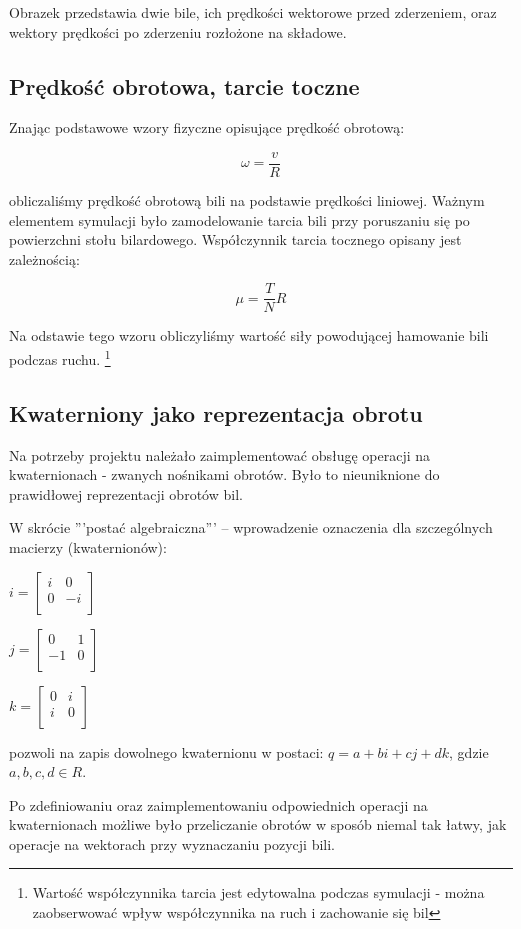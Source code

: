Obrazek przedstawia dwie bile, ich prędkości wektorowe przed zderzeniem, oraz wektory prędkości po zderzeniu rozłożone
na składowe.

\subsection{Prędkość obrotowa, tarcie toczne}

Znając podstawowe wzory fizyczne opisujące prędkość obrotową:

\begin{equation}
\omega = \frac{v}{R}
\end{equation}

obliczaliśmy prędkość obrotową bili na podstawie prędkości liniowej. Ważnym elementem symulacji było 
zamodelowanie tarcia bili przy poruszaniu się po powierzchni stołu bilardowego. Współczynnik tarcia tocznego 
opisany jest zależnością:

\begin{equation}
\mu = \frac{T}{N}R
\end{equation}

Na odstawie tego wzoru obliczyliśmy wartość siły powodującej hamowanie bili podczas ruchu.
\footnote{Wartość współczynnika tarcia jest edytowalna podczas symulacji - można zaobserwować wpływ 
współczynnika na ruch i zachowanie się bil}

\subsection{Kwaterniony jako reprezentacja obrotu}

Na potrzeby projektu należało zaimplementować obsługę operacji na kwaternionach - zwanych nośnikami obrotów.
Było to nieuniknione do prawidłowej reprezentacji obrotów bil.

W skrócie '''postać algebraiczna''' – wprowadzenie oznaczenia dla szczególnych macierzy (kwaternionów):


$i = \left[ \begin{array}{ccc}
i & 0 \\
0 & -i \\
\end{array}
\right]$

$j = \left[ \begin{array}{ccc}
0 & 1 \\
-1 & 0 \\
\end{array}
\right]$

$k = \left[ \begin{array}{ccc}
0 & i \\
i & 0 \\
\end{array}
\right]$

pozwoli na zapis dowolnego kwaternionu w postaci: $q=a+bi+cj+dk$, gdzie $a, b, c, d \in R$.

Po zdefiniowaniu oraz zaimplementowaniu odpowiednich operacji na kwaternionach możliwe było
przeliczanie obrotów w sposób niemal tak łatwy, jak operacje na wektorach przy wyznaczaniu pozycji bili.
